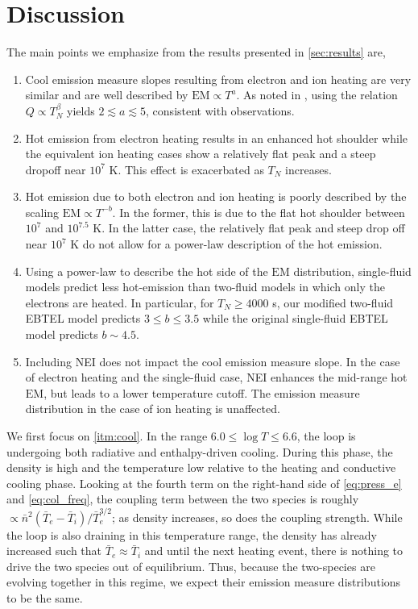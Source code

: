 \documentclass[apj]{emulateapj}
\begin{document}
	\section{Discussion}
	\label{sec:discussion}
	\par The main points we emphasize from the results presented in \autoref{sec:results} are,
	\begin{enumerate}
		\item Cool emission measure slopes resulting from electron and ion heating are very similar and are well described by $\mathrm{EM}\propto T^a$. As noted in \citet{cargill_active_2014}, using the relation $Q\propto T_N^{\beta}$ yields $2\lesssim a\lesssim5$, consistent with observations.\label{itm:cool}
		\item Hot emission from electron heating results in an enhanced hot shoulder while the equivalent ion heating cases show a relatively flat peak and a steep dropoff near $10^7$ K. This effect is exacerbated as $T_N$ increases.\label{itm:hot}
		\item Hot emission due to both electron and ion heating is poorly described by the scaling $\mathrm{EM}\propto T^{-b}$. In the former, this is due to the flat hot shoulder between $10^7$ and $10^{7.5}$ K. In the latter case, the relatively flat peak and steep drop off near $10^7$ K do not allow for a power-law description of the hot emission.\label{itm:deriv}
		\item Using a power-law to describe the hot side of the $\mathrm{EM}$ distribution, single-fluid models predict less hot-emission than two-fluid models in which only the electrons are heated. In particular, for $T_N\ge4000$ s, our modified two-fluid EBTEL model predicts $3\le b\le3.5$ while the original single-fluid EBTEL model predicts $b\sim4.5$.\label{itm:histos}
		\item Including NEI does not impact the cool emission measure slope. In the case of electron heating and the single-fluid case, NEI enhances the mid-range hot $\mathrm{EM}$, but leads to a lower temperature cutoff. The emission measure distribution in the case of ion heating is unaffected. \label{itm:nei}
	\end{enumerate}
	\par We first focus on \autoref{itm:cool}. In the range $6.0\le\log{T}\le6.6$, the loop is undergoing both radiative and enthalpy-driven cooling. During this phase, the density is high and the temperature low relative to the heating and conductive cooling phase. Looking at the fourth term on the right-hand side of \autoref{eq:press_e} and \autoref{eq:col_freq}, the coupling term between the two species is roughly $\propto\bar{n}^2(\bar{T}_e-\bar{T}_i)/\bar{T}_e^{3/2}$; as density increases, so does the coupling strength. While the loop is also draining in this temperature range, the density has already increased such that $\bar{T}_e\approx\bar{T}_i$ and until the next heating event, there is nothing to drive the two species out of equilibrium. Thus, because the two-species are evolving together in this regime, we expect their emission measure distributions to be the same.
\end{document}
